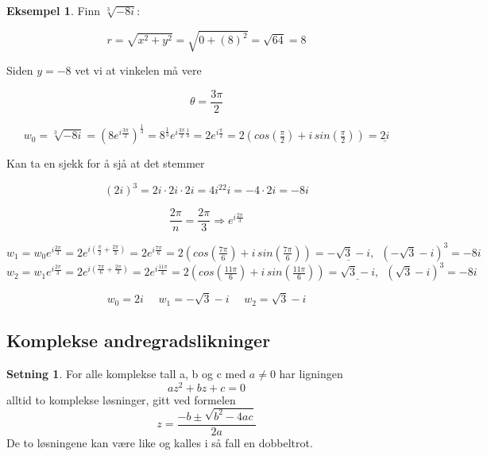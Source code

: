 \documentclass[11pt]{article}
\theoremstyle{definition}
\theoremstyle{definition}
\newtheorem{mitteks}{Eksempel}[section]
\theoremstyle{definition}
\newtheorem{minset}{Setning}[section]
\newenvironment{fminset}
{\begin{mdframed}[style=minstil]\begin{minset}}
		{\end{minset}\end{mdframed}}
\theoremstyle{definition}
\theoremstyle{definition}
\theoremstyle{definition}
\begin{document}
		\begin{mitteks}
			Finn \(\sqrt[3]{-8i} \):
			
			\[r=\sqrt{x^2+y^2}=\sqrt{0+(8)^2}=\sqrt{64}=8 \]
			
			Siden \(y=-8\) vet vi at vinkelen må vere
			
			\[\theta=\dfrac{3\pi }{2}\]
			
			\[w_0=\sqrt[3]{-8i}=(8e^{i\frac{3\pi}{2}})^\frac{1}{3}=8^{\frac{1}{3}}e^{i\frac{3\pi}{2}\frac{1}{3}}=2e^{i\frac{\pi}{2}}=2(cos(\tfrac{\pi}{2})+i\, sin(\tfrac{\pi}{2}))=\underline{2i}\]
			
			Kan ta en sjekk for å sjå at det stemmer
			
			\[(2i)^3=2i\cdot 2i\cdot 2i=4i^22i=-4\cdot2i=-8i\]
			
			\[\dfrac{2\pi}{n}=\frac{2\pi}{3}\Rightarrow e^{i\frac{2\pi}{3}}\]
			
			\[w_1=w_0e^{i\frac{2\pi}{3}}=2e^{i(\frac{\pi}{2}+\frac{2\pi}{3})}=2e^{i\frac{7\pi}{6}}=2\left( cos(\tfrac{7\pi}{6})+i\, sin(\tfrac{7\pi}{6})\right)=\underline{-\sqrt{3}-i},\,\,\, (-\sqrt{3}-i)^3=-8i \]
			\[w_2=w_1e^{i\frac{2\pi}{3}}=2e^{i(\frac{7\pi}{6}+\frac{2\pi}{3})}=2e^{i\frac{11\pi}{6}}=2\left( cos(\tfrac{11\pi}{6})+i\, sin(\tfrac{11\pi}{6})\right)=\underline{\sqrt{3}-i},\,\,\, (\sqrt{3}-i)^3=-8i \]


\[w_0=2i \hspace{16pt}w_1=-\sqrt{3}-i \hspace{16pt} w_2=\sqrt{3}-i \] 
		\end{mitteks}		
		\newpage
		
		\subsection{Komplekse andregradslikninger}
		
		\begin{fminset}
			For alle komplekse tall a, b og c med \(a\neq 0\) har ligningen \[az^2+bz+c=0\] alltid to komplekse løsninger, gitt ved formelen \[z=\dfrac{-b\pm \sqrt{b^2-4ac}}{2a}\] De to løsningene kan være like og kalles i så fall en dobbeltrot.
		\end{fminset}
		
\end{document}
